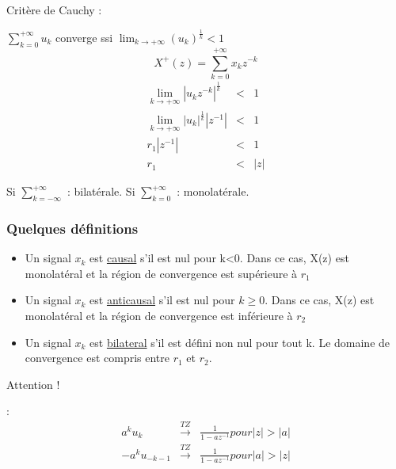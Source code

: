 \begin{bf} Critère de Cauchy :\end{bf} $\sum_{k=0}^{+\infty} u_k$ converge ssi $\lim_{k \rightarrow +\infty} (u_k)^{\frac{1}{k}} <1$
\[X^+ (z) = \sum_{k=0}^{+\infty} x_k z^{-k}\]
\begin{eqnarray*}
\lim_{k \rightarrow +\infty} |u_k z^{-k}|^{\frac{1}{k}}&<&1 \\
\lim_{k \rightarrow +\infty} |u_k|^{\frac{1}{k}} |z^{-1}| &<& 1 \\
r_1 |z^{-1}| &<& 1 \\
r_1 &<& |z|
\end{eqnarray*}

Si $\sum_{k=-\infty}^{+\infty}$ : bilatérale. Si $\sum_{k=0}^{+\infty}$ : monolatérale.

\subsubsection*{Quelques définitions}
\begin{itemize}
\item Un signal $x_k$ est \ul{causal} s'il est nul pour k<0. Dans ce cas, X(z) est monolatéral et la région de convergence est supérieure à $r_1$
\item Un signal $x_k$ est \ul{anticausal} s'il est nul pour $k\geq0$. Dans ce cas, X(z) est monolatéral et la région de convergence est inférieure à $r_2$
\item Un signal $x_k$ est \ul{bilateral} s'il est défini non nul pour tout k. Le domaine de convergence est compris entre $r_1$ et $r_2$.
\end{itemize} 

\begin{bf} Attention ! \end{bf} :
\begin{eqnarray*}
a^k u_k &\xrightarrow{TZ}& \frac{1}{1-az^{-1}} pour |z| > |a| \\
-a^k u_{-k-1} &\xrightarrow{TZ}& \frac{1}{1-az^{-1}} pour |a| > |z|
\end{eqnarray*}

